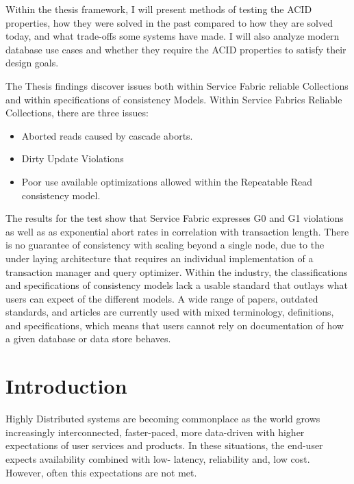\documentclass[a4paper,10pt,titlepage]{report}
\begin{document}
    Within the thesis framework, I will present methods of testing the ACID properties, how they were solved in the past compared to how they are solved today, and what trade-offs some systems have made. I will also analyze modern database use cases and whether they require the ACID properties to satisfy their design goals.\\
    \vspace{5mm}


    The Thesis findings discover issues both within Service Fabric reliable Collections and within specifications of consistency Models. 
    Within Service Fabrics Reliable Collections, there are three issues: 
    \begin{itemize}
    \item Aborted reads caused by cascade aborts.
    \item Dirty Update Violations
    \item Poor use available optimizations allowed within the Repeatable Read consistency model. 
    \end{itemize}
    
    The results for the test show that Service Fabric expresses G0 and G1 violations as well as as exponential abort rates in correlation with transaction length. There is no guarantee of consistency with scaling beyond a single node, due to the under laying architecture that requires an individual implementation of a transaction manager and query optimizer.
    Within the industry, the classifications and specifications of consistency models lack a usable standard that outlays what users can expect of the different models.
    A wide range of papers, outdated standards, and articles are currently used with mixed terminology, definitions, and specifications, which means that users cannot rely on documentation of how a given database or data store behaves.




    \chapter{Introduction}
    Highly Distributed systems are becoming commonplace as the world grows increasingly interconnected, faster-paced, more data-driven with higher expectations of user services and products. In these situations, the end-user expects availability combined with low- latency, reliability and, low cost.
    However, often this expectations are not met.
    
\end{document}
